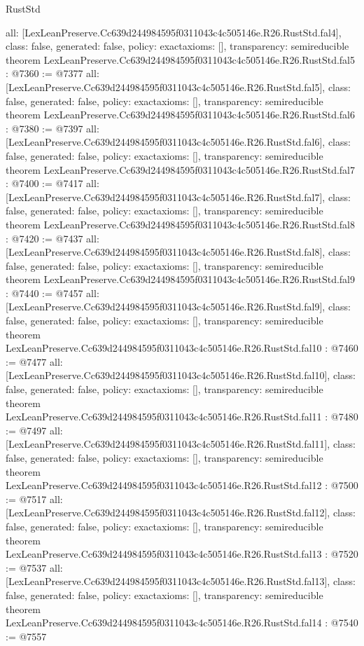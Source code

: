 \begin{lexlean}{RustStd}
\begin{coremodule}
{  all: [LexLeanPreserve.Cc639d244984595f0311043c4c505146e.R26.RustStd.fal4],
  class: false,
  generated: false,
  policy: exact{axioms: []},
  transparency: semireducible
}
theorem LexLeanPreserve.Cc639d244984595f0311043c4c505146e.R26.RustStd.fal5 : @7360 := @7377 {
  all: [LexLeanPreserve.Cc639d244984595f0311043c4c505146e.R26.RustStd.fal5],
  class: false,
  generated: false,
  policy: exact{axioms: []},
  transparency: semireducible
}
theorem LexLeanPreserve.Cc639d244984595f0311043c4c505146e.R26.RustStd.fal6 : @7380 := @7397 {
  all: [LexLeanPreserve.Cc639d244984595f0311043c4c505146e.R26.RustStd.fal6],
  class: false,
  generated: false,
  policy: exact{axioms: []},
  transparency: semireducible
}
theorem LexLeanPreserve.Cc639d244984595f0311043c4c505146e.R26.RustStd.fal7 : @7400 := @7417 {
  all: [LexLeanPreserve.Cc639d244984595f0311043c4c505146e.R26.RustStd.fal7],
  class: false,
  generated: false,
  policy: exact{axioms: []},
  transparency: semireducible
}
theorem LexLeanPreserve.Cc639d244984595f0311043c4c505146e.R26.RustStd.fal8 : @7420 := @7437 {
  all: [LexLeanPreserve.Cc639d244984595f0311043c4c505146e.R26.RustStd.fal8],
  class: false,
  generated: false,
  policy: exact{axioms: []},
  transparency: semireducible
}
theorem LexLeanPreserve.Cc639d244984595f0311043c4c505146e.R26.RustStd.fal9 : @7440 := @7457 {
  all: [LexLeanPreserve.Cc639d244984595f0311043c4c505146e.R26.RustStd.fal9],
  class: false,
  generated: false,
  policy: exact{axioms: []},
  transparency: semireducible
}
theorem LexLeanPreserve.Cc639d244984595f0311043c4c505146e.R26.RustStd.fal10 : @7460 := @7477 {
  all: [LexLeanPreserve.Cc639d244984595f0311043c4c505146e.R26.RustStd.fal10],
  class: false,
  generated: false,
  policy: exact{axioms: []},
  transparency: semireducible
}
theorem LexLeanPreserve.Cc639d244984595f0311043c4c505146e.R26.RustStd.fal11 : @7480 := @7497 {
  all: [LexLeanPreserve.Cc639d244984595f0311043c4c505146e.R26.RustStd.fal11],
  class: false,
  generated: false,
  policy: exact{axioms: []},
  transparency: semireducible
}
theorem LexLeanPreserve.Cc639d244984595f0311043c4c505146e.R26.RustStd.fal12 : @7500 := @7517 {
  all: [LexLeanPreserve.Cc639d244984595f0311043c4c505146e.R26.RustStd.fal12],
  class: false,
  generated: false,
  policy: exact{axioms: []},
  transparency: semireducible
}
theorem LexLeanPreserve.Cc639d244984595f0311043c4c505146e.R26.RustStd.fal13 : @7520 := @7537 {
  all: [LexLeanPreserve.Cc639d244984595f0311043c4c505146e.R26.RustStd.fal13],
  class: false,
  generated: false,
  policy: exact{axioms: []},
  transparency: semireducible
}
theorem LexLeanPreserve.Cc639d244984595f0311043c4c505146e.R26.RustStd.fal14 : @7540 := @7557 {
}
\end{coremodule}
\end{lexlean}
